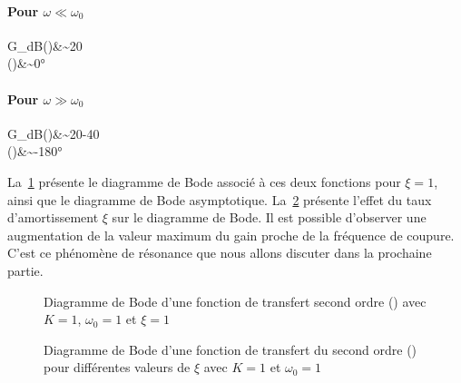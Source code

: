 \paragraph{Pour $\omega \ll\omega_0$}
\begin{bequation}
G_{dB}(\omega)&\sim20\\
\phi(\omega)&\sim0\si{\degree}
\end{bequation}
\paragraph{Pour $\omega \gg\omega_0$}
\begin{bequation}
G_{dB}(\omega)&\sim20-40\log\omega\\
    \phi(\omega)&\sim-180\si{\degree}
\end{bequation}
La~\cref{fig-bode_2nd_1} présente le diagramme de Bode associé à ces deux 
fonctions pour $\xi=1$, ainsi que le diagramme de Bode asymptotique. 
La~\cref{fig-bode_2nd_2} présente l'effet du taux d'amortissement $\xi$ sur 
le diagramme de Bode. Il est possible d'observer une augmentation de la valeur 
maximum du gain proche de la fréquence de coupure.
C'est ce phénomène de résonance que nous allons discuter dans la 
prochaine partie.
\begin{figure}[!t]
    \centering
    

    
    \caption{Diagramme de Bode d'une fonction de transfert second ordre 
    () avec $K=1$, $\omega_0=1$ et $\xi=1$
    \label{fig-bode_2nd_1}}
\end{figure}
\begin{figure}[!t]
    \centering
    
    \caption{Diagramme de Bode d'une fonction de transfert du second ordre 
             () pour différentes valeurs de $\xi$ avec 
             $K=1$ et $\omega_0=1$\label{fig-bode_2nd_2}}
\end{figure}
\afterpage{\clearpage}
